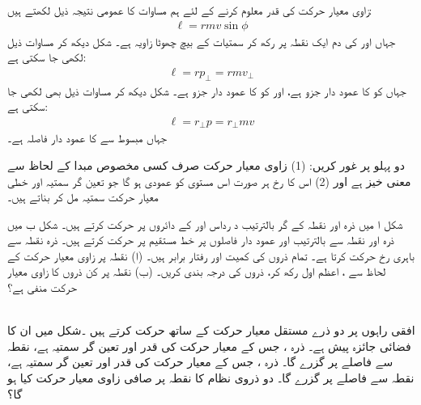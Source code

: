  \quad
     زاوی معیار حرکت   کی قدر  معلوم  کرنے کے لئے ہم   مساوات  کا عمومی نتیجہ  ذیل لکھتے ہیں:
 \begin{align}\label{مساوات_لڑھکاو_زاوی_قدر_معیار_حرکت}
 \ell=rmv\sin\phi
 \end{align}
 جہاں  اور   کی دم ایک نقطہ پر رکھ کر  سمتیات کے بیچ چھوٹا زاویہ  ہے۔ شکل  دیکھ کر مساوات  ذیل لکھی جا سکتی ہے:
 \begin{align}
 \ell=rp_{\perp}=rmv_{\perp}
 \end{align}
 جہاں  کو   کا عمود دار  جزو  ہے، اور   کو   کا عمود دار  جزو  ہے۔ شکل  دیکھ کر مساوات  ذیل بھی لکھی جا سکتی ہے:
 \begin{align}\label{مساوات_لڑھکاو_سمتیہ_زاوی_قوت_مروڑ_چہارم}
 \ell=r_{\perp}p=r_{\perp}mv
 \end{align}
 جہاں مبسوط     سے  کا  عمود دار فاصلہ  ہے۔
 
 \quad
 دو  پہلو پر غور کریں: (1)  زاوی معیار حرکت صرف  کسی مخصوص مبدا کے لحاظ سے معنی خیز ہے اور (2)  اس کا رخ ہر صورت اس مستوی کو عمودی ہو گا جو   تعین گر سمتیہ  اور  خطی معیار حرکت  سمتیہ   مل کر بناتے ہیں۔
 
 شکل     ا میں  ذرہ  اور  نقطہ  کے گر بالترتیب د رداس  اور  کے دائروں پر حرکت کرتے ہیں۔ شکل ب میں ذرہ  اور   نقطہ  سے بالترتیب   اور   عمود دار فاصلوں پر  خط مستقیم پر حرکت کرتے ہیں۔ ذرہ  نقطہ  سے باہری رخ حرکت کرتا ہے۔ تمام  ذروں کی کمیت اور رفتار برابر ہیں۔ (ا)  نقطہ  پر زاوی معیار حرکت کے لحاظ سے ، اعظم اول رکھ کر، ذروں کی درجہ بندی کریں۔ (ب)  نقطہ  پر کن ذروں کا زاوی معیار حرکت منفی ہے؟
 
 \\
 افقی راہوں پر  دو ذرے مستقل معیار حرکت  کے ساتھ  حرکت کرتے ہیں ۔شکل  میں ان کا فضائی جائزہ پیش ہے۔ ذرہ  ، جس کے معیار حرکت کی قدر  اور تعین گر سمتیہ  ہے، نقطہ  سے   فاصلے پر گزرے گا۔  ذرہ  ، جس کے معیار حرکت کی قدر  اور تعین گر 
 سمتیہ  ہے، نقطہ  سے   فاصلے پر گزرے گا۔ دو ذروی نظام کا نقطہ  پر صافی زاوی معیار حرکت  کیا ہو گا؟
 
